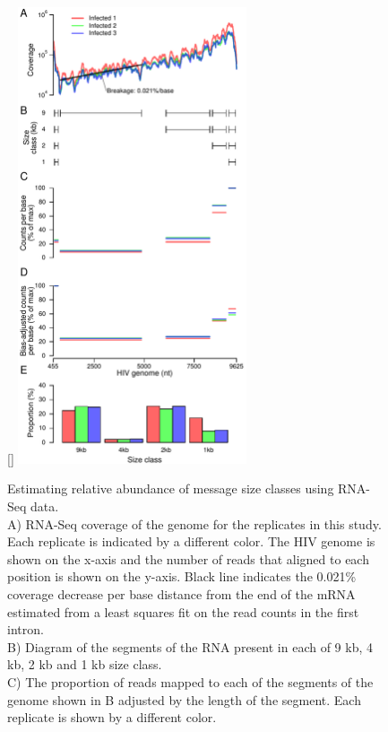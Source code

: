 \documentclass[../sherrill-Mix_thesis.tex]{subfiles}
\begin{document}
		\begin{figure}
				\centering
				[\FBwidth]{
					\includegraphics[width=0.6\textwidth]{additionalFile5.pdf}
				}{
					\caption[Estimating relative abundance of \hivEight{} message size classes using RNA-Seq data]{
						Estimating relative abundance of \hivEight{} message size classes using RNA-Seq data.\\
						A) RNA-Seq coverage of the \hivEight{} genome for the replicates in this study. Each replicate is indicated by a different color. The HIV genome is shown on the x-axis and the number of reads that aligned to each position is shown on the y-axis. Black line indicates the 0.021\% coverage decrease per base distance from the \threePrime{} end of the mRNA estimated from a least squares fit on the read counts in the first intron.\\
						B) Diagram of the segments of the \hivEight{} RNA present in each of 9 kb, 4 kb, 2 kb and 1 kb size class. \\
						C) The proportion of reads mapped to each of the segments of the \hivEight{} genome shown in B adjusted by the length of the segment. Each replicate is shown by a different color.\\
}}
\end{figure}
\end{document}
